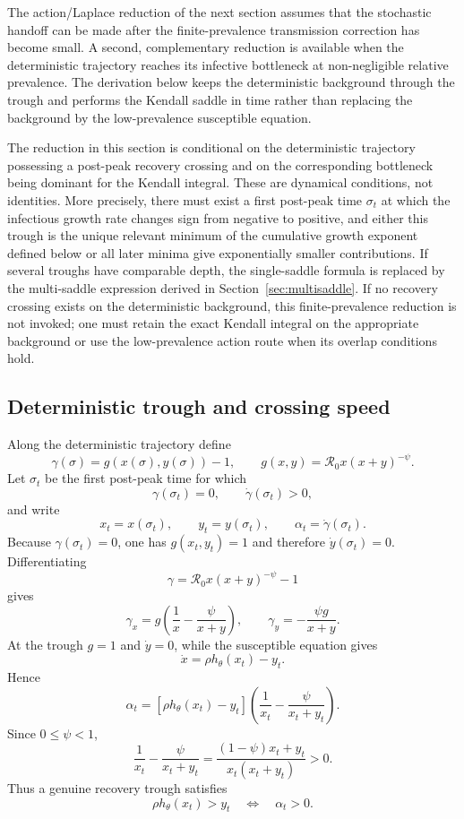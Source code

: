 \documentclass[11pt]{article}
\newcommand{\Rzero}{\mathcal R_0}
\newcommand{\hth}{h_\theta}
\begin{document}
The action/Laplace reduction of the next section assumes that the stochastic handoff can be made after the finite-prevalence transmission correction has become small.  A second, complementary reduction is available when the deterministic trajectory reaches its infective bottleneck at non-negligible relative prevalence.  The derivation below keeps the deterministic background through the trough and performs the Kendall saddle in time rather than replacing the background by the low-prevalence susceptible equation.

The reduction in this section is conditional on the deterministic trajectory possessing a post-peak recovery crossing and on the corresponding bottleneck being dominant for the Kendall integral.  These are dynamical conditions, not identities.  More precisely, there must exist a first post-peak time $\sigma_t$ at which the infectious growth rate changes sign from negative to positive, and either this trough is the unique relevant minimum of the cumulative growth exponent defined below or all later minima give exponentially smaller contributions.  If several troughs have comparable depth, the single-saddle formula is replaced by the multi-saddle expression derived in Section~\ref{sec:multisaddle}.  If no recovery crossing exists on the deterministic background, this finite-prevalence reduction is not invoked; one must retain the exact Kendall integral on the appropriate background or use the low-prevalence action route when its overlap conditions hold.

\subsection{Deterministic trough and crossing speed}
Along the deterministic trajectory define
\[
\gamma(\sigma)=g(x(\sigma),y(\sigma))-1,
\qquad
 g(x,y)=\Rzero x(x+y)^{-\psi}.
\]
Let $\sigma_t$ be the first post-peak time for which
\[
\gamma(\sigma_t)=0,
\qquad
\dot\gamma(\sigma_t)>0,
\]
and write
\[
x_t=x(\sigma_t),
\qquad
y_t=y(\sigma_t),
\qquad
\alpha_t=\dot\gamma(\sigma_t).
\]
Because $\gamma(\sigma_t)=0$, one has $g(x_t,y_t)=1$ and therefore $\dot y(\sigma_t)=0$.  Differentiating
\[
\gamma=\Rzero x(x+y)^{-\psi}-1
\]
gives
\[
\gamma_x=g\left(\frac1x-\frac{\psi}{x+y}\right),
\qquad
\gamma_y=-\frac{\psi g}{x+y}.
\]
At the trough $g=1$ and $\dot y=0$, while the susceptible equation gives
\[
\dot x=\rho\hth(x_t)-y_t.
\]
Hence
\[
\boxed{
\alpha_t
=[\rho\hth(x_t)-y_t]
\left(\frac1{x_t}-\frac{\psi}{x_t+y_t}\right).
}
\]
Since $0\leq\psi<1$,
\[
\frac1{x_t}-\frac{\psi}{x_t+y_t}
=\frac{(1-\psi)x_t+y_t}{x_t(x_t+y_t)}>0.
\]
Thus a genuine recovery trough satisfies
\[
\rho\hth(x_t)>y_t
\quad\Longleftrightarrow\quad
\alpha_t>0.
\]
\end{document}
